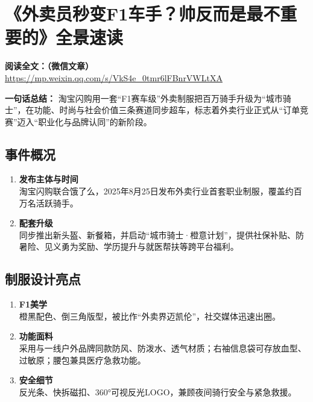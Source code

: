 \clearpage

\section{《外卖员秒变F1车手？帅反而是最不重要的》全景速读}
\vspace{1cm}
\noindent\textbf{阅读全文：（微信文章）} \url{https://mp.weixin.qq.com/s/VkS4e_0tmr6lFBnrVWLtXA}

\textbf{一句话总结：}  
淘宝闪购用一套“F1赛车级”外卖制服把百万骑手升级为“城市骑士”，在功能、时尚与社会价值三条赛道同步超车，标志着外卖行业正式从“订单竞赛”迈入“职业化与品牌认同”的新阶段。

\subsection{事件概况}
\begin{enumerate}[leftmargin=*, nosep]
    \item \textbf{发布主体与时间}  \\
    淘宝闪购联合饿了么，2025年8月25日发布外卖行业首套职业制服，覆盖约百万名活跃骑手。
    \item \textbf{配套升级}  \\
    同步推出新头盔、新餐箱，并启动“城市骑士·橙意计划”，提供社保补贴、防暑险、见义勇为奖励、学历提升与就医帮扶等跨平台福利。
\end{enumerate}

\subsection{制服设计亮点}
\begin{enumerate}[leftmargin=*, nosep]
    \item \textbf{F1美学}  \\
    橙黑配色、倒三角版型，被比作“外卖界迈凯伦”，社交媒体迅速出圈。
    \item \textbf{功能面料}  \\
    采用与一线户外品牌同款防风、防泼水、透气材质；右袖信息袋可存放血型、过敏原；腰包兼具医疗急救功能。
    \item \textbf{安全细节}  \\
    反光条、快拆磁扣、360°可视反光LOGO，兼顾夜间骑行安全与紧急救援。
\end{enumerate}

